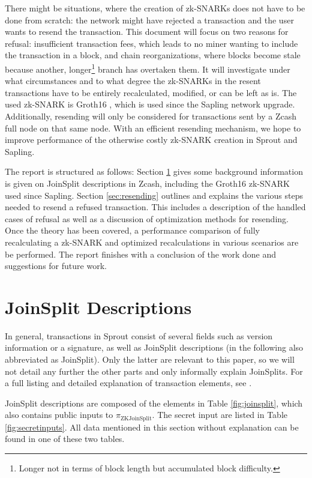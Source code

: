 \documentclass{article}
\begin{document}
There might be situations, where the creation of zk-SNARKs does not have to be done from scratch: the network might have rejected a transaction and the user wants to resend the transaction.
This document will focus on two reasons for refusal: insufficient transaction fees, which leads to no miner wanting to include the transaction in a block, and chain reorganizations, where blocks become stale because another, longer\footnote{Longer not in terms of block length but accumulated block difficulty.} branch has overtaken them.
It will investigate under what circumstances and to what degree the zk-SNARKs in the resent transactions have to be entirely recalculated, modified, or can be left as is.
The used zk-SNARK is Groth16 \cite{groth:zksnark}, which is used since the Sapling network upgrade.
Additionally, resending will only be considered for transactions sent by a Zcash full node on that same node.
With an efficient resending mechanism, we hope to improve performance of the otherwise costly zk-SNARK creation in Sprout and Sapling.

The report is structured as follows: Section \ref{sec:joinsplit} gives some background information is given on JoinSplit descriptions in Zcash, including the Groth16 zk-SNARK used since Sapling.
Section \ref{sec:resending} outlines and explains the various steps needed to resend a refused transaction.
This includes a description of the handled cases of refusal as well as a discussion of optimization methods for resending.
Once the theory has been covered, a performance comparison of fully recalculating a zk-SNARK and optimized recalculations in various scenarios are be performed.
The report finishes with a conclusion of the work done and suggestions for future work.

\section{JoinSplit Descriptions} \label{sec:joinsplit}

In general, transactions in Sprout consist of several fields such as version information or a signature, as well as JoinSplit descriptions (in the following also abbreviated as JoinSplit).
Only the latter are relevant to this paper, so we will not detail any further the other parts and only informally explain JoinSplits.
For a full listing and detailed explanation of transaction elements, see \cite{hopwood:zcash}.

JoinSplit descriptions are composed of the elements in Table \ref{fig:joinsplit}, which also contains public inputs to $\pi_\text{ZKJoinSplit}$.
The secret input are listed in Table \ref{fig:secretinputs}.
All data mentioned in this section without explanation can be found in one of these two tables.
\end{document}
